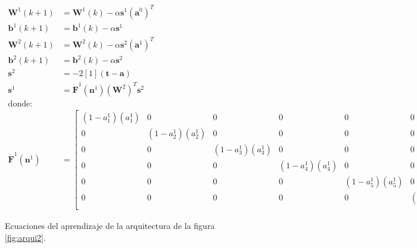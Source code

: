 \begin{figure}[H]
    \begin{align*}
    \boldsymbol{W}^{1}(k+1) &= \boldsymbol{W}^{1}(k) - \alpha \boldsymbol{s}^{1} (\boldsymbol{a}^{0})^T \\
    \boldsymbol{b}^{1}(k+1) &= \boldsymbol{b}^{1}(k) - \alpha \boldsymbol{s}^{1} \\
    \boldsymbol{W}^{2}(k+1) &= \boldsymbol{W}^{2}(k) - \alpha \boldsymbol{s}^{2} (\boldsymbol{a}^{1})^T \\
    \boldsymbol{b}^{2}(k+1) &= \boldsymbol{b}^{2}(k) - \alpha \boldsymbol{s}^{2} \\
    \boldsymbol{s}^2 &= 
    -2 \left[ 1 \right] (\boldsymbol{t-a}) \\
    \boldsymbol{s}^{1} &= 
    \boldsymbol{\dot{F}}^{1}(\boldsymbol{n}^{1})(\boldsymbol{W}^{2})^{T}
    \boldsymbol{s}^{2} \\
    \text{donde:} \\
    \boldsymbol{\dot{F}}^{1}(\boldsymbol{n}^{1}) &=
    \begin{bmatrix}
    (1-a_{1}^1)(a_{1}^1) & 0 & 0 & 0 & 0 & 0 \\
    0 & (1-a_{2}^1)(a_{2}^1) & 0 & 0 & 0 & 0 \\
    0 & 0 & (1-a_{3}^1)(a_{3}^1) & 0 & 0 & 0 \\
    0 & 0 & 0 & (1-a_{4}^1)(a_{4}^1) & 0 & 0 \\
    0 & 0 & 0 & 0 & (1-a_{5}^1)(a_{5}^1) & 0 \\
    0 & 0 & 0 & 0 & 0 & (1-a_{6}^1)(a_{6}^1) \\
    \end{bmatrix}
    \end{align*}
    \caption{Ecuaciones del aprendizaje de la arquitectura de la figura \ref{fig:arqui2}.}
\end{figure}

